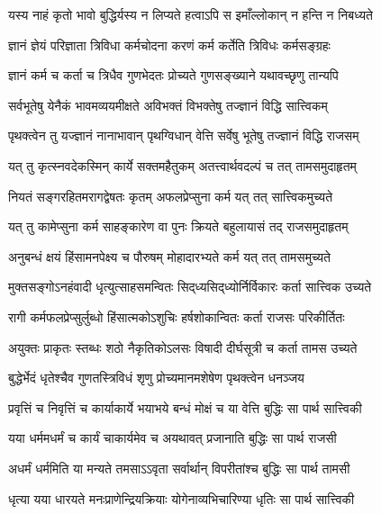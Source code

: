 \twolineshloka
{यस्य नाहं कृतो भावो बुद्धिर्यस्य न लिप्यते}
{हत्वाऽपि स इमाँल्लोकान् न हन्ति न निबध्यते}%

\twolineshloka
{ज्ञानं ज्ञेयं परिज्ञाता त्रिविधा कर्मचोदना}
{करणं कर्म कर्तेति त्रिविधः कर्मसङ्ग्रहः}%

\twolineshloka
{ज्ञानं कर्म च कर्ता च त्रिधैव गुणभेदतः}
{प्रोच्यते गुणसङ्ख्याने यथावच्छृणु तान्यपि}%

\twolineshloka
{सर्वभूतेषु येनैकं भावमव्ययमीक्षते}
{अविभक्तं विभक्तेषु तज्ज्ञानं विद्धि सात्त्विकम्}%

\twolineshloka
{पृथक्त्वेन तु यज्ज्ञानं नानाभावान् पृथग्विधान्}
{वेत्ति सर्वेषु भूतेषु तज्ज्ञानं विद्धि राजसम्}%

\twolineshloka
{यत् तु कृत्स्नवदेकस्मिन् कार्ये सक्तमहैतुकम्}
{अतत्त्वार्थवदल्पं च तत् तामसमुदाहृतम्}%

\twolineshloka
{नियतं सङ्गरहितमरागद्वेषतः कृतम्}
{अफलप्रेप्सुना कर्म यत् तत् सात्त्विकमुच्यते}%

\twolineshloka
{यत् तु कामेप्सुना कर्म साहङ्कारेण वा पुनः}
{क्रियते बहुलायासं तद् राजसमुदाहृतम्}%

\twolineshloka
{अनुबन्धं क्षयं हिंसामनपेक्ष्य च पौरुषम्}
{मोहादारभ्यते कर्म यत् तत् तामसमुच्यते}%

\twolineshloka
{मुक्तसङ्गोऽनहंवादी धृत्युत्साहसमन्वितः}
{सिद्‌ध्यसिद्‌ध्योर्निर्विकारः कर्ता सात्त्विक उच्यते}%

\twolineshloka
{रागी कर्मफलप्रेप्सुर्लुब्धो हिंसात्मकोऽशुचिः}
{हर्षशोकान्वितः कर्ता राजसः परिकीर्तितः}%

\twolineshloka
{अयुक्तः प्राकृतः स्तब्धः शठो नैकृतिकोऽलसः}
{विषादी दीर्घसूत्री च कर्ता तामस उच्यते}%

\twolineshloka
{बुद्धेर्भेदं धृतेश्चैव गुणतस्त्रिविधं शृणु}
{प्रोच्यमानमशेषेण पृथक्त्वेन धनञ्जय}%

\twolineshloka
{प्रवृत्तिं च निवृत्तिं च कार्याकार्ये भयाभये}
{बन्धं मोक्षं च या वेत्ति बुद्धिः सा पार्थ सात्त्विकी}%

\twolineshloka
{यया धर्ममधर्मं च कार्यं चाकार्यमेव च}
{अयथावत् प्रजानाति बुद्धिः सा पार्थ राजसी}%

\twolineshloka
{अधर्मं धर्ममिति या मन्यते तमसाऽऽवृता}
{सर्वार्थान् विपरीतांश्च बुद्धिः सा पार्थ तामसी}%

\twolineshloka
{धृत्या यया धारयते मनःप्राणेन्द्रियक्रियाः}
{योगेनाव्यभिचारिण्या धृतिः सा पार्थ सात्त्विकी}%

